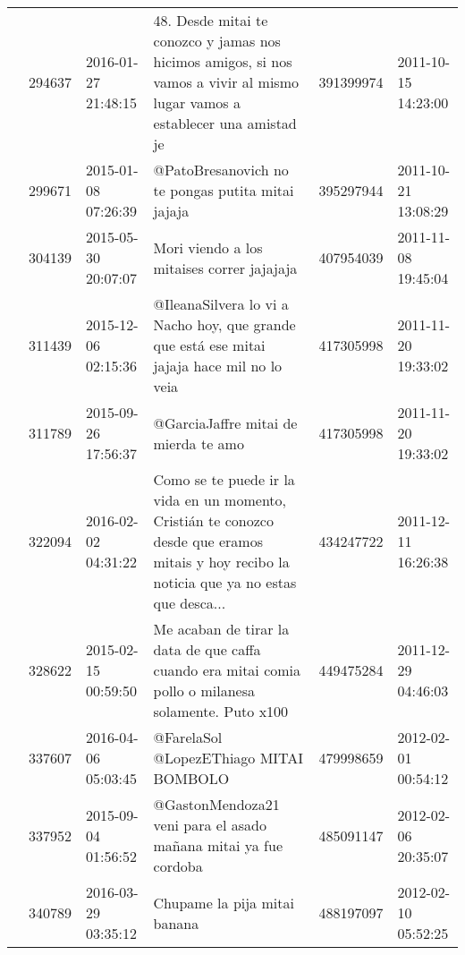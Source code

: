 \begin{tabular}{llllrl}
           & 294637  & 2016-01-27 21:48:15 &                 48. Desde mitai te conozco y jamas nos hicimos amigos, si nos vamos a vivir al mismo lugar vamos a establecer una amistad je &   391399974 & 2011-10-15 14:23:00 \\
           & 299671  & 2015-01-08 07:26:39 &                                                                                            @PatoBresanovich no te pongas putita mitai jajaja &   395297944 & 2011-10-21 13:08:29 \\
           & 304139  & 2015-05-30 20:07:07 &                                                                                                   Mori viendo a los mitaises correr jajajaja &   407954039 & 2011-11-08 19:45:04 \\
           & 311439  & 2015-12-06 02:15:36 &                                                   @IleanaSilvera lo vi a Nacho hoy, que grande que está ese mitai jajaja hace mil no lo veia &   417305998 & 2011-11-20 19:33:02 \\
           & 311789  & 2015-09-26 17:56:37 &                                                                                                         @GarciaJaffre mitai de mierda te amo &   417305998 & 2011-11-20 19:33:02 \\
           & 322094  & 2016-02-02 04:31:22 &  Como se te puede ir la vida en un momento, Cristián te conozco desde que eramos mitais y hoy recibo la noticia que ya no estas que desca... &   434247722 & 2011-12-11 16:26:38 \\
           & 328622  & 2015-02-15 00:59:50 &                                         Me acaban de tirar la data de que caffa cuando era mitai comia pollo o milanesa solamente. Puto x100 &   449475284 & 2011-12-29 04:46:03 \\
           & 337607  & 2016-04-06 05:03:45 &                                                                                                       @FarelaSol @LopezEThiago MITAI BOMBOLO &   479998659 & 2012-02-01 00:54:12 \\
           & 337952  & 2015-09-04 01:56:52 &                                                                              @GastonMendoza21 veni para el asado mañana mitai ya fue cordoba &   485091147 & 2012-02-06 20:35:07 \\
           & 340789  & 2016-03-29 03:35:12 &                                                                                                                 Chupame la pija mitai banana &   488197097 & 2012-02-10 05:52:25 \\

\end{tabular}
